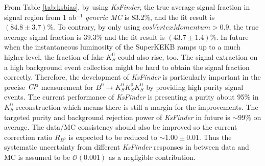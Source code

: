 From Table \ref{tab:ksbias}, by using \textit{KsFinder}, the true average signal fraction in signal region from 1 ab$^{-1}$ \textit{generic MC} is 83.2\%, and the fit result is $(84.8\pm3.7)\%$. To contrary, by only using ${cosVertexMomentum>0.9}$, the true average signal fraction is 39.3\% and the fit result is $(43.7\pm1.4)\%$. In future when the instantaneous luminosity of the SuperKEKB ramps up to a much higher level, the fraction of fake $K_S^0$ could also rise, too. The signal extraction on a high background event collection might be hard to obtain the signal fraction correctly.
Therefore, the development of \textit{KsFinder} is particularly important in the precise $\it{CP}$ measurement for $B^0 \to K_S^0  K_S^0  K_S^0$ by providing high purity signal events. The current performance of \textit{KsFinder} is presenting a purity about 95\% in $K_S^0$ reconstruction which means there is still a margin for the improvements. The targeted purity and background rejection power of \textit{KsFinder} in future is $\sim 99\%$ on average. The data/MC consistency should also be improved so the current correction ratio $R_{B^0}$ is expected to be reduced to $\sim 1.00\pm 0.01$. Thus the systematic uncertainty from different \textit{KsFinder} responses in between data and MC is assumed to be $\mathcal{O}(0.001)$ as a negligible contribution. 



